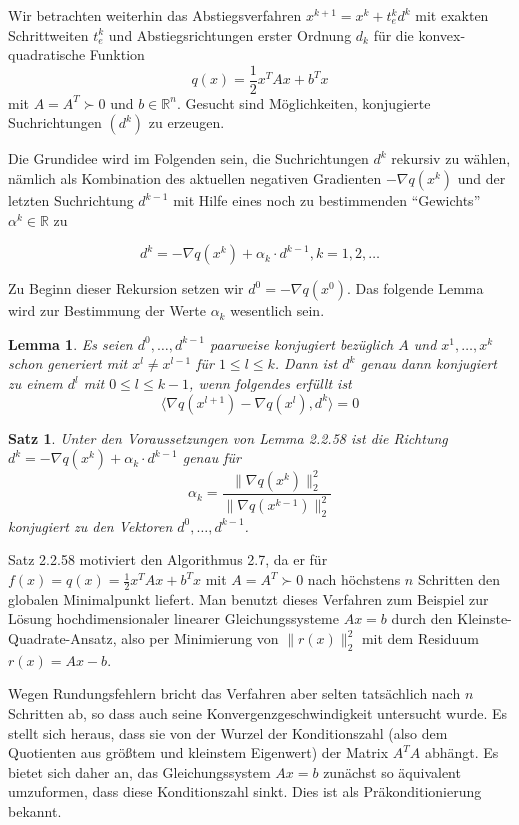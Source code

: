 \documentclass[11pt]{scrreprt}
\newcounter{thm}
\theoremstyle{thmstyle}
\numberwithin{thm}{section}
\newtheorem{lemma}[thm]{Lemma}
\newtheorem{satz}[thm]{Satz}
\begin{document}
Wir betrachten weiterhin das Abstiegsverfahren $x^{k+1} = x^k + t_e^k d^k$ mit exakten Schrittweiten $t_e^k$ und Abstiegsrichtungen erster Ordnung $d_k$ für die konvex-quadratische Funktion
	$$ q(x) = \frac{1}{2}x^T A x + b^T x $$
mit $A = A^T \succ 0$ und $b \in \mathbb{R}^n$. Gesucht sind Möglichkeiten, konjugierte Suchrichtungen $(d^k)$ zu erzeugen. ~\bigskip

Die Grundidee wird im Folgenden sein, die Suchrichtungen $d^k$ rekursiv zu wählen, nämlich als Kombination des aktuellen negativen Gradienten $-\nabla q(x^k)$ und der letzten Suchrichtung $d^{k-1}$ mit Hilfe eines noch zu bestimmenden \enquote{Gewichts} $\alpha^k  \in \mathbb{R}$ zu
		
		$$ d^k = - \nabla q(x^k) + \alpha_k \cdot d^{k-1}, k = 1,2, \dotsc $$

Zu Beginn dieser Rekursion setzen wir $d^0 = -\nabla q(x^0)$. Das folgende Lemma wird zur Bestimmung der Werte $\alpha_k$ wesentlich sein.

\begin{lemma}
	Es seien $d^0, \dotsc, d^{k-1}$ paarweise konjugiert bezüglich $A$ und $x^1, \dotsc, x^k$ schon generiert mit $x^l \neq x^{l-1}$ für $1 \leq l \leq k$. Dann ist $d^k$ genau dann konjugiert zu einem $d^l$ mit $0 \leq l \leq k-1$, wenn folgendes erfüllt ist
	$$ \langle \nabla q(x^{l+1}) - \nabla q(x^l), d^k \rangle = 0 $$
\end{lemma}

\begin{satz}
	Unter den Voraussetzungen von Lemma 2.2.58 ist die Richtung $d^k = -\nabla q(x^k) + \alpha_k \cdot d^{k-1}$ genau für
	$$ \alpha_k = \frac{\| \nabla q(x^k) \|_2^2}{\| \nabla q(x^{k-1}) \|_2^2} $$
	konjugiert zu den Vektoren $d^0, \dotsc, d^{k-1}$.
\end{satz}

Satz 2.2.58 motiviert den Algorithmus 2.7, da er für $f (x) = q(x) = \frac{1}{2} x^T A x + b^T x$ mit $A = A^T \succ 0$ nach höchstens $n$ Schritten den globalen Minimalpunkt liefert. Man benutzt dieses Verfahren zum Beispiel zur Lösung hochdimensionaler linearer Gleichungssysteme $Ax = b$ durch den Kleinste-Quadrate-Ansatz, also per Minimierung von $\| r(x) \|_2^2$ mit dem Residuum $r(x) = Ax - b$. ~\bigskip

Wegen Rundungsfehlern bricht das Verfahren aber selten tatsächlich nach $n$ Schritten ab, so dass auch seine Konvergenzgeschwindigkeit untersucht wurde. Es stellt sich heraus, dass sie von der Wurzel der Konditionszahl (also dem Quotienten aus größtem und kleinstem Eigenwert) der Matrix $A^T A$ abhängt. Es bietet sich daher an, das Gleichungssystem $Ax = b$ zunächst so äquivalent umzuformen, dass diese Konditionszahl sinkt. Dies ist als Präkonditionierung bekannt.
\end{document}
